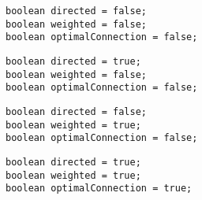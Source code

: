 
\newsavebox{\variables}
\begin{lrbox}{\variables}
	\begin{minipage}{50mm}
\begin{lstlisting}
boolean directed = false;
boolean weighted = false;
boolean optimalConnection = false;
\end{lstlisting}
	\end{minipage}
\end{lrbox}

\newsavebox{\variablesd}
\begin{lrbox}{\variablesd}
	\begin{minipage}{50mm}
\begin{lstlisting}
boolean directed = true;
boolean weighted = false;
boolean optimalConnection = false;
\end{lstlisting}
	\end{minipage}
\end{lrbox}

\newsavebox{\variablesw}
\begin{lrbox}{\variablesw}
	\begin{minipage}{50mm}
\begin{lstlisting}
boolean directed = false;
boolean weighted = true;
boolean optimalConnection = false;
\end{lstlisting}
	\end{minipage}
\end{lrbox}

\newsavebox{\variableso}
\begin{lrbox}{\variableso}
	\begin{minipage}{50mm}
\begin{lstlisting}
boolean directed = true;
boolean weighted = true;
boolean optimalConnection = true;
\end{lstlisting}
	\end{minipage}
\end{lrbox}


